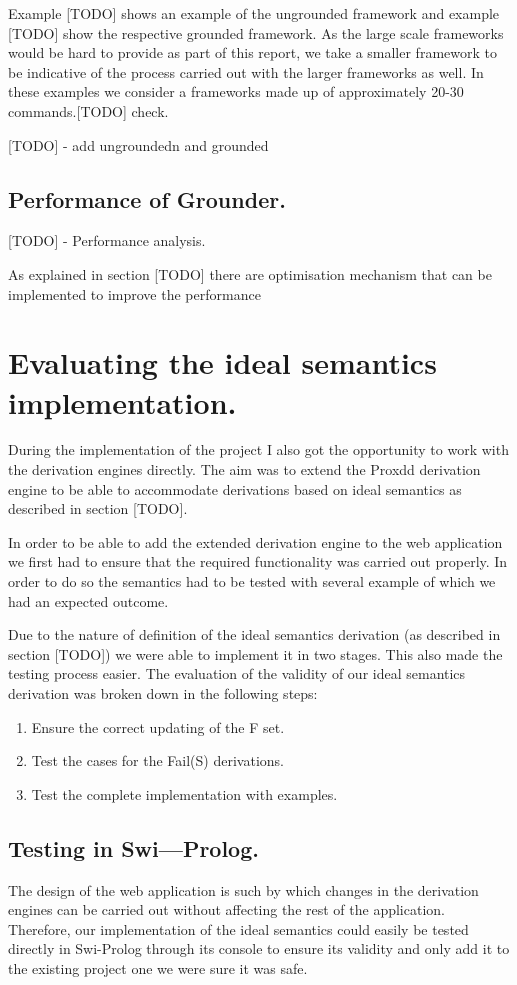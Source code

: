 Example [TODO] shows an example of the ungrounded framework and example [TODO] show the respective grounded framework. As the large scale frameworks would be hard to provide as part of this report, we take a smaller framework to be indicative of the process carried out with the larger frameworks as well. In these examples we consider a frameworks made up of approximately 20-30 commands.[TODO] check.

[TODO] - add ungroundedn and grounded


\subsection{Performance of Grounder.}

[TODO] - Performance analysis.

As explained in section [TODO] there are optimisation mechanism that can be implemented to improve the performance

\section{Evaluating the ideal semantics implementation.}
During the implementation of the project I also got the opportunity to work with the derivation engines directly. The aim was to extend the Proxdd derivation engine to be able to accommodate derivations based on ideal semantics as described in section [TODO].

In order to be able to add the extended derivation engine to the web application we first had to ensure that the required functionality was carried out properly. In order to do so the semantics had to be tested with several example of which we had an expected outcome.

Due to the nature of definition of the ideal semantics derivation (as described in section [TODO]) we were able to implement it in two stages. This also made the testing process easier. The evaluation of the validity of our ideal semantics derivation  was broken down in the following steps:

\begin{enumerate}
\item Ensure the correct updating of the F set.
\item Test the cases for the Fail(S) derivations.
\item Test the complete implementation with examples.
\end{enumerate}

\subsection{Testing in Swi---Prolog.}
The design of the web application is such by which changes in the derivation engines can be carried out without affecting the rest of the application. Therefore, our implementation of the ideal semantics could easily be tested directly in Swi-Prolog through its console to ensure its validity and only add it to the existing project one we were sure it was safe.

